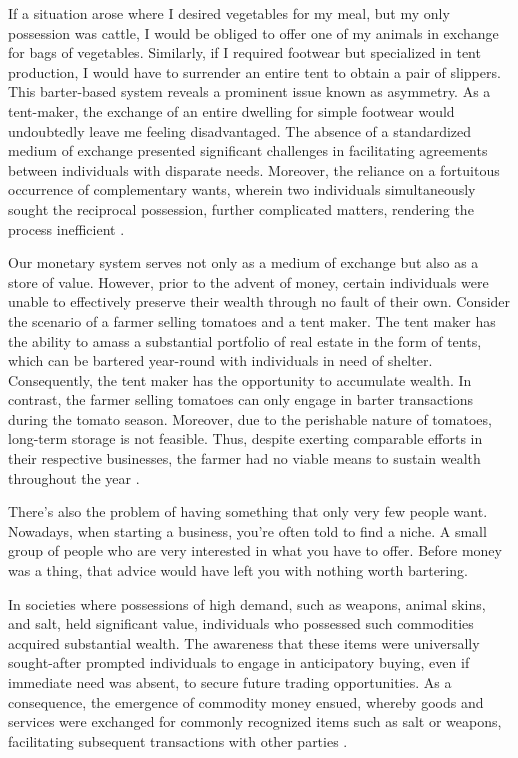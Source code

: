 If a situation arose where I desired vegetables for my meal, but my only possession was cattle, I would be obliged to offer one of my animals in exchange for
bags of vegetables. Similarly, if I required footwear but specialized in tent production, I would have to surrender an entire tent to obtain a pair of slippers.
This barter-based system reveals a prominent issue known as asymmetry. As a tent-maker, the exchange of an entire dwelling for simple footwear would undoubtedly
leave me feeling disadvantaged. The absence of a standardized medium of exchange presented significant challenges in facilitating agreements between individuals
with disparate needs. Moreover, the reliance on a fortuitous occurrence of complementary wants, wherein two individuals simultaneously sought the reciprocal
possession, further complicated matters, rendering the process inefficient \cite{goodhart1998two}.

Our monetary system serves not only as a medium of exchange but also as a store of value. However, prior to the advent of money, certain individuals were
unable to effectively preserve their wealth through no fault of their own. Consider the scenario of a farmer selling tomatoes and a tent maker. The tent
maker has the ability to amass a substantial portfolio of real estate in the form of tents, which can be bartered year-round with individuals in need of
shelter. Consequently, the tent maker has the opportunity to accumulate wealth. In contrast, the farmer selling tomatoes can only engage in barter
transactions during the tomato season. Moreover, due to the perishable nature of tomatoes, long-term storage is not feasible. Thus, despite exerting
comparable efforts in their respective businesses, the farmer had no viable means to sustain wealth throughout the year \cite{de2016origins}.

There's also the problem of having something that only very few people want. Nowadays, when starting a business, you're often told to find a niche. A small
group of people who are very interested in what you have to offer. Before money was a thing, that advice would have left you with nothing worth bartering.

In societies where possessions of high demand, such as weapons, animal skins, and salt, held significant value, individuals who possessed such commodities
acquired substantial wealth. The awareness that these items were universally sought-after prompted individuals to engage in anticipatory buying, even if
immediate need was absent, to secure future trading opportunities. As a consequence, the emergence of commodity money ensued, whereby goods and services
were exchanged for commonly recognized items such as salt or weapons, facilitating subsequent transactions with other parties \cite{polanyi1965trade}.

